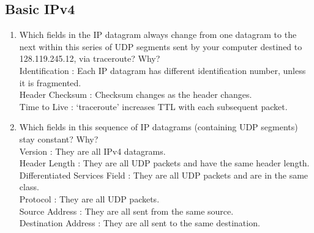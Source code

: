 \subsection{Basic IPv4}
\begin{enumerate}[label=\bfseries Problem \arabic*:,leftmargin=*,labelindent=1em]
\addtocounter{enumi}{5}
        \item Which fields in the IP datagram always change from one datagram to the next within this series of UDP segments sent by your computer destined to 128.119.245.12, via traceroute? Why?\\[0.2mm]
        \soln Identification : Each IP datagram has different identification number, unless it is fragmented. \\
                Header Checksum : Checksum changes as the header changes. \\
                Time to Live : ‘traceroute’ increases TTL with each subsequent packet. 
        \item Which fields in this sequence of IP datagrams (containing UDP segments) stay constant? Why?\\[0.2mm]
        \soln Version : They are all IPv4 datagrams. \\
                Header Length : They are all UDP packets and have the same header length. \\
                Differentiated Services Field : They are all UDP packets and are in the same class. \\
                Protocol : They are all UDP packets. \\
                Source Address : They are all sent from the same source. \\
                Destination Address : They are all sent to the same destination.

\end{enumerate}

